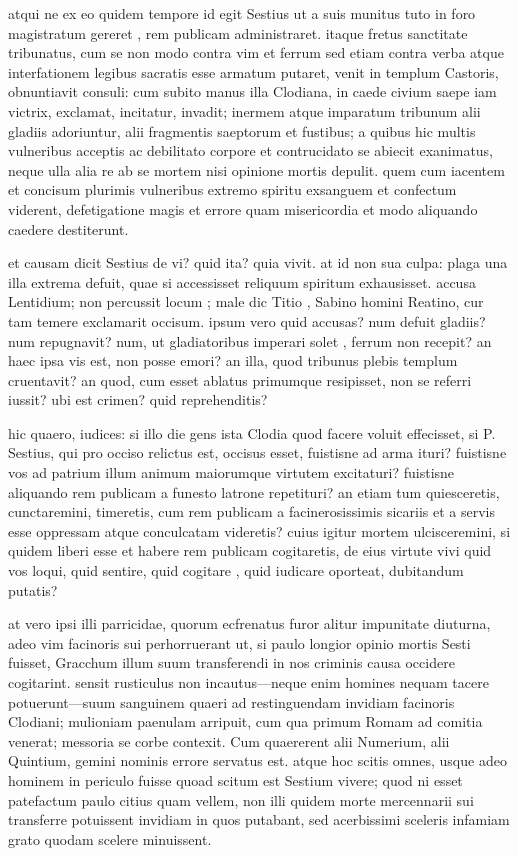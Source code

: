  atqui ne ex eo quidem tempore id egit Sestius ut a suis munitus tuto in foro magistratum gereret , rem publicam administraret. itaque fretus sanctitate tribunatus, cum se non modo contra vim et ferrum sed etiam contra verba atque interfationem legibus sacratis esse armatum putaret, venit in templum Castoris, obnuntiavit consuli: cum subito manus illa Clodiana, in caede civium saepe iam victrix, exclamat, incitatur, invadit; inermem atque imparatum tribunum alii gladiis adoriuntur, alii fragmentis saeptorum et fustibus; a quibus hic multis vulneribus acceptis ac debilitato corpore et contrucidato se abiecit exanimatus, neque ulla alia re ab se mortem nisi opinione mortis depulit. quem cum iacentem et concisum plurimis vulneribus extremo spiritu exsanguem et confectum viderent, defetigatione magis et errore quam misericordia et modo aliquando caedere destiterunt.

 et causam dicit Sestius de vi? quid ita? quia vivit. at id non sua culpa: plaga una illa extrema defuit, quae si accessisset reliquum spiritum exhausisset. accusa Lentidium; non percussit locum ; male dic Titio , Sabino homini Reatino, cur tam temere exclamarit occisum. ipsum vero quid accusas? num defuit gladiis? num repugnavit? num, ut gladiatoribus imperari solet , ferrum non recepit? an haec ipsa vis est, non posse emori? an illa, quod tribunus plebis templum cruentavit? an quod, cum esset ablatus primumque resipisset, non se referri iussit? ubi est crimen? quid reprehenditis?

 hic quaero, iudices: si illo die gens ista Clodia quod facere voluit effecisset, si P. Sestius, qui pro occiso relictus est, occisus esset, fuistisne ad arma ituri? fuistisne vos ad patrium illum animum maiorumque virtutem excitaturi? fuistisne aliquando rem publicam a funesto latrone repetituri? an etiam tum quiesceretis, cunctaremini, timeretis, cum rem publicam a facinerosissimis sicariis et a servis esse oppressam atque conculcatam videretis? cuius igitur mortem ulcisceremini, si quidem liberi esse et habere rem publicam cogitaretis, de eius virtute vivi quid vos loqui, quid sentire, quid cogitare , quid iudicare oporteat, dubitandum putatis?

 at vero ipsi illi parricidae, quorum ecfrenatus furor alitur impunitate diuturna, adeo vim facinoris sui perhorruerant ut, si paulo longior opinio mortis Sesti fuisset, Gracchum illum suum transferendi in nos criminis causa occidere cogitarint. sensit rusticulus non incautus—neque enim homines nequam tacere potuerunt—suum sanguinem quaeri ad restinguendam invidiam facinoris Clodiani; mulioniam paenulam arripuit, cum qua primum Romam ad comitia venerat; messoria se corbe contexit. Cum quaererent alii Numerium, alii Quintium, gemini nominis errore servatus est. atque hoc scitis omnes, usque adeo hominem in periculo fuisse quoad scitum est Sestium vivere; quod ni esset patefactum paulo citius quam vellem, non illi quidem morte mercennarii sui transferre potuissent invidiam in quos putabant, sed acerbissimi sceleris infamiam grato quodam scelere minuissent.

